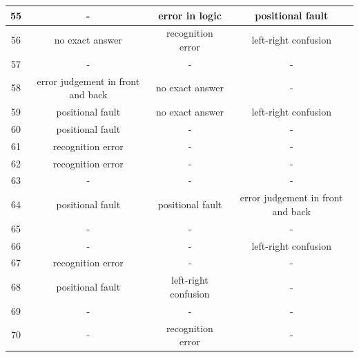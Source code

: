 \documentclass[journal,10pt]{IEEEtran}
\begin{document}
\begin{table}[ht]
{\begin{tabular}{|c|c|c|c|}
    55              & -                                 & error in logic       & positional fault                 \\ \hline
    56              & no exact answer                   & recognition error    & left-right confusion              \\ \hline
    57              & -                                 & -                    & -                                 \\ \hline
    58              & error judgement in front and back & no exact answer      & -                                 \\ \hline
    59              & positional fault                 & no exact answer      & left-right confusion              \\ \hline
    60              & positional fault                 & -                    & -                                 \\ \hline
    61              & recognition error                 & -                    & -                                 \\ \hline
    62              & recognition error                 & -                    & -                                 \\ \hline
    63              & -                                 & -                    & -                                 \\ \hline
    64              & positional fault                 & positional fault    & error judgement in front and back \\ \hline
    65              & -                                 & -                    & -                                 \\ \hline
    66              & -                                 & -                    & left-right confusion              \\ \hline
    67              & recognition error                 & -                    & -                                 \\ \hline
    68              & positional fault                 & left-right confusion & -                                 \\ \hline
    69              & -                                 & -                    & -                                 \\ \hline
    70              & -                                 & recognition error    & -                                 \\ \hline

\end{tabular}}
\end{table}
\end{document}
